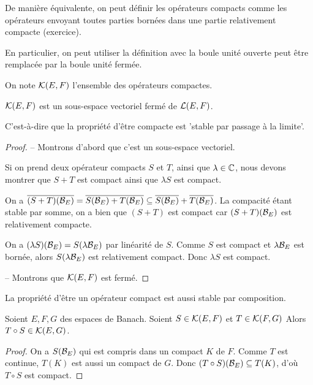 De manière équivalente, on peut définir les opérateurs compacts comme les
opérateurs envoyant toutes parties bornées dans une partie relativement
compacte (exercice).

En particulier, on peut utiliser la définition avec la boule unité ouverte peut
être remplacée par la boule unité fermée.

On note $\mathcal{K}(E, F)$ l'ensemble des opérateurs compactes.

\begin{proposition}
	$\mathcal{K}(E, F)$ est un sous-espace vectoriel fermé de
	$\mathcal{L}(E, F)$.

	C'est-à-dire que la propriété d'être compacte est 'stable par passage à la
	limite'.
\end{proposition}

\begin{proof}
	-- Montrons d'abord que c'est un sous-espace vectoriel.

	Si on prend deux opérateur compacts $S$ et $T$, ainsi que $\lambda \in
	\mathbb{C}$, nous devons montrer que $S + T$ est compact ainsi que $\lambda S$
	est compact.

	On a $\overline{(S + T)(\mathcal{B}_{E})} =  \overline{S(\mathcal{B}_{E}) +
	T(\mathcal{B}_{E})} \subseteq \overline{S(\mathcal{B}_{E})} +
	\overline{T(\mathcal{B}_{E})}$. La compacité étant stable par somme, on a bien
	que $(S + T)$ est compact car $(S + T)(\mathcal{B}_{E})$ est relativement
	compacte.

	On a $(\lambda S)(\mathcal{B}_{E}) = S(\lambda \mathcal{B}_{E})$ par
	linéarité de $S$. Comme $S$ est compact et $\lambda \mathcal{B}_{E}$ est
	bornée, alors $S(\lambda \mathcal{B}_{E})$ est relativement compact. Donc
	$\lambda S$ est compact.

	-- Montrons que $\mathcal{K}(E, F)$ est fermé.
\end{proof}

La propriété d'être un opérateur compact est aussi stable par composition.

\begin{proposition}
	Soient $E, F, G$ des espaces de Banach.
	Soient $S \in \mathcal{K}(E, F)$ et $T \in \mathcal{K}(F, G)$
	Alors $T \circ S \in \mathcal{K}(E, G)$.
\end{proposition}

\begin{proof}
	On a $S(\mathcal{B}_{E})$ qui est compris dans un compact $K$ de $F$. Comme $T$ est
	continue, $T(K)$ est aussi un compact de $G$. Donc $(T \circ
	S)(\mathcal{B}_{E}) \subseteq T(K)$, d'où $T \circ S$ est compact.
\end{proof}

